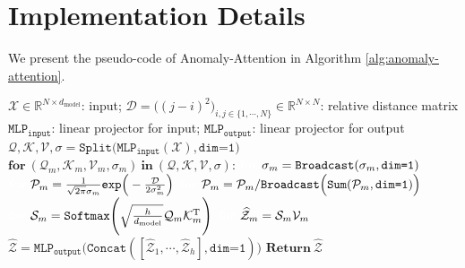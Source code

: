 \documentclass{article} %
\begin{document}
\section{Implementation Details}\label{sec:app_algo}
We present the pseudo-code of Anomaly-Attention in Algorithm \ref{alg:anomaly-attention}. 
\begin{algorithm*}[hbp]
  \caption{Anomaly-Attention Mechanism (multi-head version). }
  \label{alg:anomaly-attention}  
  \begin{algorithmic}[1]
    \Require  
   $\mathcal{X}\in\mathbb{R}^{N \times d_{\text{model}}}$: input; $\mathcal{D}=\Big((j-i)^2\Big)_{i,j\in\{1,\cdots,N\}}\in\mathbb{R}^{N \times N}$: relative distance matrix
    \Ensure $\texttt{MLP}_{\texttt{input}}$: linear projector for input; $\texttt{MLP}_{\texttt{output}}$: linear projector for output
    \State $\mathcal{Q},\mathcal{K},\mathcal{V},\sigma = \texttt{Split}\Big(\texttt{MLP}_{\texttt{input}}(\mathcal{X}),\texttt{dim=1}\Big)$ 
    \State $\textbf{for}\ (\mathcal{Q}_{m},\mathcal{K}_{m},\mathcal{V}_{m},\sigma_{m})\ \textbf{in}\ (\mathcal{Q},\mathcal{K},\mathcal{V},\sigma)\textbf{:}$
    \State $\textbf{\textcolor{white}{for}}\ \sigma_{m}=\texttt{Broadcast}(\sigma_{m},\texttt{dim=1})$
    \State $\textbf{\textcolor{white}{for}}\ \mathcal{P}_{m}=\frac{1}{\sqrt{2\pi}\sigma_m}\texttt{exp}\Big(-\frac{\mathcal{D}}{2\sigma_m^2}\Big)$
    \State $\textbf{\textcolor{white}{for}}\ \mathcal{P}_{m}=\mathcal{P}_{m}/\texttt{Broadcast}\Big(\texttt{Sum}(\mathcal{P}_{m}, \texttt{dim=1})\Big)$
    \State $\textbf{\textcolor{white}{for}}\ \mathcal{S}_{m}=\texttt{Softmax}\Bigg(\sqrt{\frac{h}{d_{\text{model}}}}\mathcal{Q}_{m}\mathcal{K}_{m}^{\text{T}}\Bigg)$
    \State $\textbf{\textcolor{white}{for}}\ {\widehat{\mathcal{Z}}}_{m}=\mathcal{S}_{m}\mathcal{V}_{m}$
    \State ${\widehat{\mathcal{Z}}}=\texttt{MLP}_{\texttt{output}}\Big(\texttt{Concat}([{\widehat{\mathcal{Z}}}_{1},\cdots,{\widehat{\mathcal{Z}}}_{h}],\texttt{dim=1})\Big)$
    \State $\textbf{Return}\ {\widehat{\mathcal{Z}}}$
  \end{algorithmic}  
\end{algorithm*}
\end{document}
